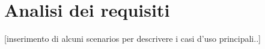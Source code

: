 \section{Analisi dei requisiti}
[inserimento di alcuni scenarios per descrivere i casi d'uso principali..]